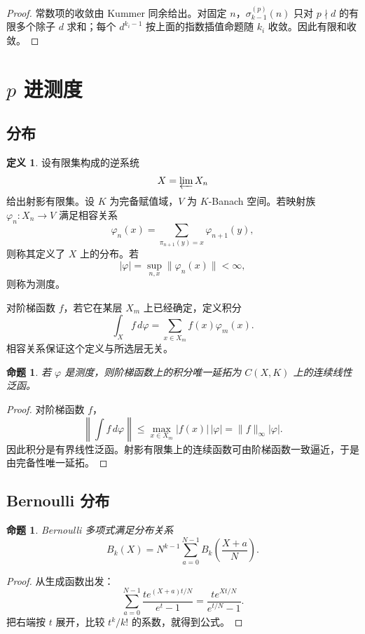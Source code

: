 \documentclass[11pt,a4paper,openany]{ctexbook}
\numberwithin{equation}{chapter}
\theoremstyle{plain}
\newtheorem{proposition}[theorem]{命题}
\theoremstyle{definition}
\newtheorem{definition}[theorem]{定义}
\theoremstyle{remark}
\begin{document}
\begin{proof}
常数项的收敛由 Kummer 同余给出。对固定 $n$，$\sigma_{k-1}^{(p)}(n)$ 只对 $p\nmid d$ 的有限多个除子 $d$ 求和；每个 $d^{k_i-1}$ 按上面的指数插值命题随 $k_i$ 收敛。因此有限和收敛。
\end{proof}

\section{\texorpdfstring{$p$ 进测度}{p 进测度}}

\subsection{分布}

\begin{definition}
设有限集构成的逆系统
\[
  X=\varprojlim X_n
\]
给出射影有限集。设 $K$ 为完备赋值域，$V$ 为 $K$-Banach 空间。若映射族 $\varphi_n:X_n\to V$ 满足相容关系
\[
  \varphi_n(x)=\sum_{\pi_{n+1}(y)=x}\varphi_{n+1}(y),
\]
则称其定义了 $X$ 上的分布。若
\[
  |\varphi|=\sup_{n,x}\|\varphi_n(x)\|<\infty,
\]
则称为测度。
\end{definition}

对阶梯函数 $f$，若它在某层 $X_m$ 上已经确定，定义积分
\[
  \int_X f\,d\varphi=\sum_{x\in X_m}f(x)\varphi_m(x).
\]
相容关系保证这个定义与所选层无关。

\begin{proposition}
若 $\varphi$ 是测度，则阶梯函数上的积分唯一延拓为 $C(X,K)$ 上的连续线性泛函。
\end{proposition}

\begin{proof}
对阶梯函数 $f$，
\[
  \left\|\int f\,d\varphi\right\|
  \le \max_{x\in X_m}|f(x)|\,|\varphi|
  =\|f\|_\infty|\varphi|.
\]
因此积分是有界线性泛函。射影有限集上的连续函数可由阶梯函数一致逼近，于是由完备性唯一延拓。
\end{proof}

\subsection{Bernoulli 分布}

\begin{proposition}
Bernoulli 多项式满足分布关系
\[
  B_k(X)=N^{k-1}\sum_{a=0}^{N-1}B_k\!\left(\frac{X+a}{N}\right).
\]
\end{proposition}

\begin{proof}
从生成函数出发：
\[
  \sum_{a=0}^{N-1}\frac{t e^{(X+a)t/N}}{e^t-1}
  =\frac{t e^{Xt/N}}{e^{t/N}-1}.
\]
把右端按 $t$ 展开，比较 $t^k/k!$ 的系数，就得到公式。
\end{proof}
\end{document}
